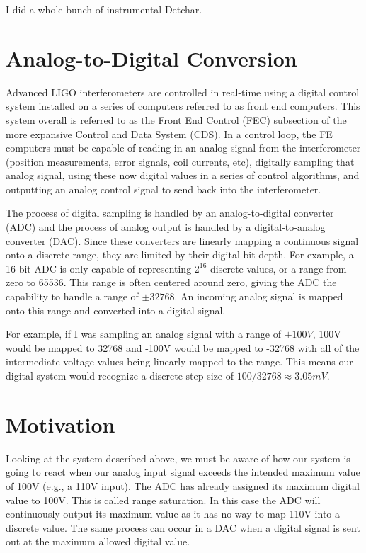 I did a whole bunch of instrumental Detchar.

\section{Analog-to-Digital Conversion}

Advanced LIGO interferometers are controlled in real-time using a digital control system installed on a series of computers referred to as front end computers.  This system overall is referred to as the Front End Control (FEC) subsection of the more expansive Control and Data System (CDS).  In a control loop, the FE computers must be capable of reading in an analog signal from the interferometer (position measurements, error signals, coil currents, etc), digitally sampling that analog signal, using these now digital values in a series of control algorithms, and outputting an analog control signal to send back into the interferometer.

The process of digital sampling is handled by an analog-to-digital converter (ADC) and the process of analog output is handled by a digital-to-analog converter (DAC).  Since these converters are linearly mapping a continuous signal onto a discrete range, they are limited by their digital bit depth.  For example, a 16 bit ADC is only capable of representing $2^{16}$ discrete values, or a range from zero to 65536.  This range is often centered around zero, giving the ADC the capability to handle a range of $\pm32768$.  An incoming analog signal is mapped onto this range and converted into a digital signal.

For example, if I was sampling an analog signal with a range of $\pm100V$, 100V would be mapped to 32768 and -100V would be mapped to -32768 with all of the intermediate voltage values being linearly mapped to the range. This means our digital system would recognize a discrete step size of $100/32768 \approx 3.05 mV$.

\section{Motivation}

Looking at the system described above, we must be aware of how our system is going to react when our analog input signal exceeds the intended maximum value of 100V (e.g., a 110V input). The ADC has already assigned its maximum digital value to 100V. This is called range saturation. In this case the ADC will continuously output its maximum value as it has no way to map 110V into a discrete value. The same process can occur in a DAC when a digital signal is sent out at the maximum allowed digital value.

